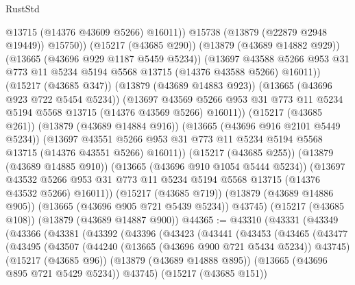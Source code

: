 \begin{lexlean}{RustStd}
\begin{coremodule}
                      @13715
                      (@14376 @43609 @5266)
                      @16011))
                  @15738
                  (@13879 (@22879 @2948 @19449))
                  @15750))
              (@15217 (@43685 @290))
              (@13879 (@43689 @14882 @929))
              (@13665 (@43696 @929 @1187 @5459 @5234))
              (@13697
                @43588
                @5266
                @953
                @31
                @773
                @11
                @5234
                @5194
                @5568
                @13715
                (@14376 @43588 @5266)
                @16011))
            (@15217 (@43685 @347))
            (@13879 (@43689 @14883 @923))
            (@13665 (@43696 @923 @722 @5454 @5234))
            (@13697
              @43569
              @5266
              @953
              @31
              @773
              @11
              @5234
              @5194
              @5568
              @13715
              (@14376 @43569 @5266)
              @16011))
          (@15217 (@43685 @261))
          (@13879 (@43689 @14884 @916))
          (@13665 (@43696 @916 @2101 @5449 @5234))
          (@13697
            @43551
            @5266
            @953
            @31
            @773
            @11
            @5234
            @5194
            @5568
            @13715
            (@14376 @43551 @5266)
            @16011))
        (@15217 (@43685 @255))
        (@13879 (@43689 @14885 @910))
        (@13665 (@43696 @910 @1054 @5444 @5234))
        (@13697
          @43532
          @5266
          @953
          @31
          @773
          @11
          @5234
          @5194
          @5568
          @13715
          (@14376 @43532 @5266)
          @16011))
      (@15217 (@43685 @719))
      (@13879 (@43689 @14886 @905))
      (@13665 (@43696 @905 @721 @5439 @5234))
      @43745)
    (@15217 (@43685 @108))
    (@13879 (@43689 @14887 @900))
@44365 := @43310
    (@43331
      (@43349
        (@43366
          (@43381
            (@43392
              (@43396
                (@43423
                  (@43441
                    (@43453
                      (@43465
                        (@43477
                          (@43495
                            (@43507
                              (@44240 (@13665 (@43696 @900 @721 @5434 @5234)) @43745)
                              (@15217 (@43685 @96))
                              (@13879 (@43689 @14888 @895))
                              (@13665 (@43696 @895 @721 @5429 @5234))
                              @43745)
                            (@15217 (@43685 @151))

\end{coremodule}
\end{lexlean}
